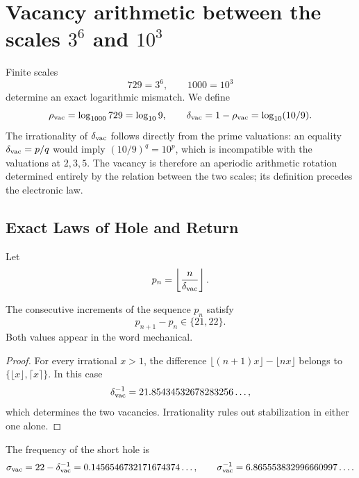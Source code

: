\section{Vacancy arithmetic between the scales \texorpdfstring{\(3^6\)}{3 raised to 6} and \texorpdfstring{\(10^3\)}{10 raised to 3}}
\label{sec:vacancias-corriente-electron-rev11}

Finite scales
\[
 729=3^6,
 \qquad
 1000=10^3
\]
determine an exact logarithmic mismatch. We define
\begin{equation}
 \rho_{\rm vac}=\log_{1000}729=\log_{10}9,
 \qquad
 \delta_{\rm vac}=1-\rho_{\rm vac}=\log_{10}(10/9).
 \label{eq:delta-vacancias-rev11}
\end{equation}
The irrationality of \(\delta_{\rm vac}\) follows directly from the prime valuations: an equality \(\delta_{\rm vac}=p/q\) would imply \((10/9)^q=10^p\), which is incompatible with the valuations at \(2,3,5\). The vacancy is therefore an aperiodic arithmetic rotation determined entirely by the relation between the two scales; its definition precedes the electronic law.

\subsection{Exact Laws of Hole and Return}

Let
\[
 p_n=\left\lfloor\frac{n}{\delta_{\rm vac}}\right\rfloor.
\]

\begin{theorem}
\label{thm:ley-huecos-vacancias-rev11}
The consecutive increments of the sequence \(p_n\) satisfy
\[
 p_{n+1}-p_n\in\{21,22\}.
\]
Both values appear in the word mechanical.
\end{theorem}

\begin{proof}
For every irrational \(x>1\), the difference
\(\lfloor(n+1)x\rfloor-\lfloor nx\rfloor\) belongs to
\(\{\lfloor x\rfloor,\lceil x\rceil\}\). In this case
\[
 \delta_{\rm vac}^{-1}
 =21.85434532678283256\ldots,
\]
which determines the two vacancies. Irrationality rules out stabilization
in either one alone.
\end{proof}

The frequency of the short hole is
\[
 \sigma_{\rm vac}=22-\delta_{\rm vac}^{-1}
 =0.1456546732171674374\ldots,
 \qquad
 \sigma_{\rm vac}^{-1}=6.865553832996660997\ldots.
\]

